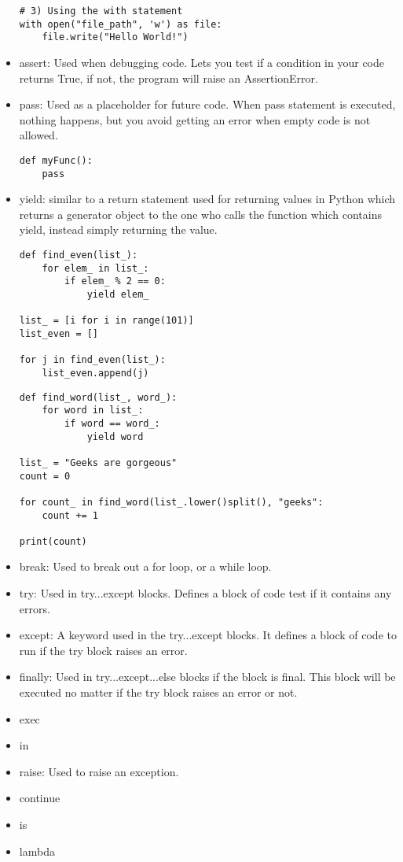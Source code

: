 \documentclass[a4paper, 12pt]{article}
\begin{document}
\begin{itemize}
\begin{tcolorbox}
\begin{lstlisting}
# 3) Using the with statement
with open("file_path", 'w') as file:
	file.write("Hello World!")
\end{lstlisting}
\end{tcolorbox}
\item{assert: Used when debugging code. Lets you test if a condition in your code returns True, if not, the program will raise an AssertionError.}
\item{pass: Used as a placeholder for future code. When pass statement is executed, nothing happens, but you avoid getting an error when empty code is not allowed.}
\begin{tcolorbox}
\begin{lstlisting}
def myFunc():
	pass
\end{lstlisting}
\end{tcolorbox}
\item{yield: similar to a return statement used for returning values in Python which returns a generator object to the one who calls the function which contains yield, instead simply returning the value.}
\begin{tcolorbox}
\begin{lstlisting}
def find_even(list_):
	for elem_ in list_:
		if elem_ % 2 == 0:
			yield elem_
			
list_ = [i for i in range(101)]
list_even = []

for j in find_even(list_):
	list_even.append(j)
\end{lstlisting}
\end{tcolorbox}

\pagebreak

\begin{tcolorbox}
\begin{lstlisting}
def find_word(list_, word_):
	for word in list_:
		if word == word_:
			yield word
			
list_ = "Geeks are gorgeous"
count = 0

for count_ in find_word(list_.lower()split(), "geeks":
	count += 1
	
print(count)
\end{lstlisting}
\end{tcolorbox}
\item{break: Used to break out a for loop, or a while loop.}
\item{try: Used in try...except blocks. Defines a block of code test if it contains any errors.}
\item{except: A keyword used in the try...except blocks. It defines a block of code to run if the try block raises an error.}
\item{finally: Used in try...except...else blocks if the block is final. This block will be executed no matter if the try block raises an error or not.}
\item{exec}
\item{in}
\item{raise: Used to raise an exception.}
\item{continue}
\item{is}
\item{lambda}
\end{itemize}
\end{document}
